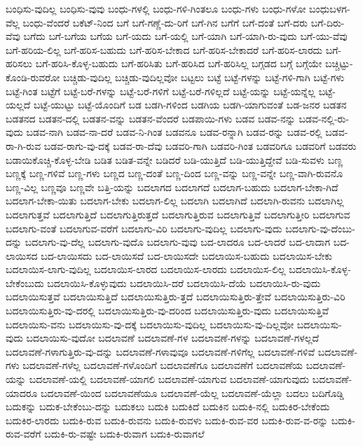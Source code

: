 {ಬಂಧಿಸು-ವುದಿಲ್ಲ
ಬಂಧಿಸು-ವುವು
ಬಂಧು-ಗಳಲ್ಲಿ
ಬಂಧು-ಗಳಿ-ಗಿಂತಲೂ
ಬಂಧು-ಗಳು
ಬಂಧು-ಗಳೋ
ಬಂಧುಬಳಗ-ವೆಲ್ಲ
ಬಂಧು-ವೆಂದರೆ
ಬಕೆಟ್-ನಿಂದ
ಬಗೆ
ಬಗೆ-ಗಣ್ಣೆ-ದು-ರಿಗೆ
ಬಗೆ-ಗಿನ
ಬಗೆಗೆ
ಬಗೆ-ದಂತೆ
ಬಗೆ-ದರು
ಬಗೆ-ದಿರು-ವೆವು
ಬಗೆದು
ಬಗೆ-ಬಗೆಯ
ಬಗೆಯ
ಬಗೆ-ಯದು
ಬಗೆ-ಯಲ್ಲಿ
ಬಗೆ-ಯಾಗಿ
ಬಗೆ-ಯಾಗಿ-ರು-ವುದು
ಬಗೆ-ಯು-ವೆವು
ಬಗೆ-ಹರಿಯ-ಲಿಲ್ಲ
ಬಗೆ-ಹರಿಸ-ಬಹುದು
ಬಗೆ-ಹರಿಸ-ಬೇಕಾದ
ಬಗೆ-ಹರಿಸ-ಬೇಕಾದರೆ
ಬಗೆ-ಹರಿಸ-ಲಾರದು
ಬಗೆ-ಹರಿಸಲು
ಬಗೆ-ಹರಿಸಿ-ಕೊಳ್ಳ-ಬಹುದು
ಬಗೆ-ಹರಿಸಿತು
ಬಗೆ-ಹರಿಸಿದ
ಬಗೆ-ಹರಿಸಿಲ್ಲ
ಬಗ್ಗಡದ
ಬಗ್ಗೆ
ಬಗ್ಗೆಯೇ
ಬಚ್ಚಿಟ್ಟು-ಕೊಂಡಿ-ರುವರೋ
ಬಚ್ಚಿಡು-ವುದಿಲ್ಲ
ಬಚ್ಚಿಡು-ವುದಿಲ್ಲವೋ
ಬಟ್ಟಲು
ಬಟ್ಟೆ
ಬಟ್ಟೆ-ಗಳನ್ನು
ಬಟ್ಟೆ-ಗಳಿ-ಗಾಗಿ
ಬಟ್ಟೆ-ಗಳು
ಬಟ್ಟೆ-ಗಿಂತ
ಬಟ್ಟೆಗೆ
ಬಟ್ಟೆ-ಬರೆ-ಗಳನ್ನು
ಬಟ್ಟೆ-ಬರೆ-ಗಳಿಗೆ
ಬಟ್ಟೆ-ಬರೆ-ಗಳಿಲ್ಲದೆ
ಬಟ್ಟೆ-ಯನ್ನು
ಬಟ್ಟೆ-ಯನ್ನೆಲ್ಲ
ಬಟ್ಟೆ-ಯಲ್ಲದೆ
ಬಟ್ಟೆ-ಯುಟ್ಟು
ಬಟ್ಟೆ-ಯೊಂದಿಗೆ
ಬಡ
ಬಡಗಿ-ಗಳಿಂದ
ಬಡಗಿಯ
ಬಡಗಿ-ಯಾಗುವಂತೆ
ಬಡ-ಜನರ
ಬಡತನ
ಬಡತನದ
ಬಡತನ-ದಲ್ಲಿ
ಬಡತನ-ವನ್ನು
ಬಡತನ-ವೆಂದರೆ
ಬಡಪಾಯಿ-ಗಳು
ಬಡವ
ಬಡವ-ನನ್ನು
ಬಡವ-ನಲ್ಲಿ-ರು-ವುದು
ಬಡವ-ನಾಗಿ
ಬಡವ-ನಾ-ದರೆ
ಬಡವ-ನಿ-ಗಿಂತ
ಬಡವನೂ
ಬಡವ-ರನ್ನಾಗಿ
ಬಡವ-ರನ್ನು
ಬಡವ-ರಲ್ಲಿ
ಬಡವ-ರಾ-ಗಿ-ರುವ
ಬಡವ-ರಾಗು-ವು-ದಕ್ಕೆ
ಬಡವ-ರಾ-ದೆವು
ಬಡವರಿ-ಗಾಗಿ
ಬಡವರಿ-ಗಿಂತ
ಬಡವರಿಗೂ
ಬಡವರಿಗೆ
ಬಡವರು
ಬಡಾಯಿಕೊಚ್ಚಿ-ಕೊಳ್ಳ-ಬೇಡಿ
ಬಡಿತ
ಬಡಿತ-ವನ್ನೇ
ಬಡಿದರೆ
ಬಡಿ-ಯುತ್ತಿದೆ
ಬಡಿ-ಯುತ್ತಿದ್ದೇವೆ
ಬಡಿ-ಸುವಳು
ಬಣ್ಣ
ಬಣ್ಣಕ್ಕೆ
ಬಣ್ಣ-ಗಳಿವೆ
ಬಣ್ಣ-ಗಳು
ಬಣ್ಣದ
ಬಣ್ಣ-ದಂತೆ
ಬಣ್ಣ-ದಿಂದ
ಬಣ್ಣ-ವನ್ನು
ಬಣ್ಣ-ವನ್ನೇ
ಬಣ್ಣ-ವಾಗಿ-ರುವನೊ
ಬಣ್ಣ-ವಿಲ್ಲ
ಬಣ್ಣವೂ
ಬಣ್ಣವೇ
ಬತ್ತಿ-ಯನ್ನು
ಬದಲಾಗದ
ಬದಲಾಗದೆ
ಬದಲಾಗ-ಬಹುದು
ಬದಲಾಗ-ಬೇಕಾ-ಗಿದೆ
ಬದಲಾಗ-ಬೇಕಾ-ಯಿತು
ಬದಲಾಗ-ಬೇಕು
ಬದಲಾಗ-ಲಿಲ್ಲ
ಬದಲಾಗಿ
ಬದಲಾಗಿದೆ
ಬದಲಾಗಿ-ರುವನು
ಬದಲಾಗಿಲ್ಲ
ಬದಲಾಗುತ್ತವೆ
ಬದಲಾಗುತ್ತಿದೆ
ಬದಲಾಗುತ್ತಿರುತ್ತದೆ
ಬದಲಾಗುತ್ತಿರುವ
ಬದಲಾಗುತ್ತಿವೆ
ಬದಲಾಗುತ್ತೀರಿ
ಬದಲಾಗುವ
ಬದಲಾಗು-ವಂತೆ
ಬದಲಾಗುವ-ವರೆಗೆ
ಬದಲಾಗು-ವಿರಿ
ಬದಲಾಗು-ವುದಿಲ್ಲ
ಬದಲಾಗು-ವುದು
ಬದಲಾಗು-ವು-ದೆಂಬು-ದನ್ನು
ಬದಲಾಗು-ವು-ದೆಲ್ಲ
ಬದಲಾಗು-ವುದೊ
ಬದಲಾಗು-ವುವು
ಬದ-ಲಾದರೂ
ಬದ-ಲಾದರೆ
ಬದ-ಲಾದಾಗ
ಬದ-ಲಾಯಿಸದ
ಬದ-ಲಾಯಿಸದು
ಬದ-ಲಾಯಿಸದೆ
ಬದ-ಲಾಯಿಸದೇ
ಬದಲಾಯಿಸ-ಬಹುದು
ಬದಲಾಯಿಸ-ಬೇಕು
ಬದಲಾಯಿಸ-ಲಾಗು-ವುದಿಲ್ಲ
ಬದಲಾಯಿಸ-ಲಾರದ
ಬದಲಾಯಿಸ-ಲಾರದು
ಬದಲಾಯಿಸ-ಲಿಲ್ಲ
ಬದಲಾಯಿಸಿ-ಕೊಳ್ಳ-ಬೇಕೆಂಬುದು
ಬದಲಾಯಿಸಿ-ಕೊಳ್ಳುವುದು
ಬದಲಾಯಿಸಿ-ದರೆ
ಬದಲಾಯಿಸಿ-ದೆಯೆ
ಬದಲಾಯಿಸಿ-ರು-ವುದು
ಬದಲಾಯಿಸುತ್ತವೆ
ಬದಲಾಯಿಸುತ್ತಿದೆ
ಬದಲಾಯಿಸುತ್ತಿರು-ತ್ತದೆ
ಬದಲಾಯಿಸುತ್ತಿರು-ತ್ತೇವೆ
ಬದಲಾಯಿಸುತ್ತಿರು-ವಿರಿ
ಬದಲಾಯಿಸುತ್ತಿರು-ವು-ದರಲ್ಲಿ
ಬದಲಾಯಿಸುತ್ತಿರು-ವು-ದರಿಂದ
ಬದಲಾಯಿಸುತ್ತಿರು-ವುದು
ಬದಲಾಯಿಸುತ್ತಿವೆ
ಬದಲಾಯಿಸು-ವನು
ಬದಲಾಯಿಸು-ವು-ದಕ್ಕೆ
ಬದಲಾಯಿಸು-ವುದಿಲ್ಲ
ಬದಲಾಯಿಸು-ವು-ದಿಲ್ಲವೋ
ಬದಲಾಯಿಸು-ವುದು
ಬದಲಾಯಿಸು-ವುದೋ
ಬದಲಾವಣೆ
ಬದಲಾವಣೆ-ಗಳ
ಬದಲಾವಣೆ-ಗಳನ್ನು
ಬದಲಾವಣೆ-ಗಳಲ್ಲದೆ
ಬದಲಾವಣೆ-ಗಳಾಗುತ್ತಿರು-ವು-ದನ್ನು
ಬದಲಾವಣೆ-ಗಳಾವುವೂ
ಬದಲಾವಣೆ-ಗಳಿಗೆಲ್ಲ
ಬದಲಾವಣೆ-ಗಳಿವೆ
ಬದಲಾವಣೆ-ಗಳು
ಬದಲಾವಣೆ-ಗಳೆಲ್ಲ
ಬದಲಾವಣೆ-ಗಳೊಂದಿಗೆ
ಬದಲಾವಣೆಗೂ
ಬದಲಾವಣೆಗೆ
ಬದಲಾವಣೆಯ
ಬದಲಾವಣೆ-ಯನ್ನು
ಬದಲಾವಣೆ-ಯಲ್ಲಿ
ಬದಲಾವಣೆ-ಯಾಗಲಿ
ಬದಲಾವಣೆ-ಯಾಗುವ
ಬದಲಾವಣೆ-ಯಾಗುವುದು
ಬದಲಾವಣೆ-ಯಾದರೂ
ಬದಲಾವಣೆ-ಯಿಂದ
ಬದಲಾವಣೆಯೂ
ಬದಲಾವಣೆ-ಯೆಲ್ಲ
ಬದಲಾವಣೆ-ಯೆಲ್ಲಾ
ಬದಲು
ಬದಿಗೊಡ್ಡಿ
ಬದುಕನ್ನು
ಬದುಕ-ಬೇಕೆಂಬು-ದನ್ನು
ಬದುಕಲು
ಬದುಕಿ
ಬದುಕಿದೆ
ಬದುಕಿನ
ಬದುಕಿ-ನಲ್ಲಿ
ಬದುಕಿರ-ಬೇಕೆಂದು
ಬದುಕಿರ-ಲಾರದು
ಬದುಕಿ-ರುವ
ಬದುಕಿ-ರುವನು
ಬದುಕಿ-ರುವಳು
ಬದುಕಿ-ರುವ-ವರ
ಬದುಕಿ-ರುವ-ವ-ರನ್ನು
ಬದುಕಿ-ರುವ-ವರೆಗೆ
ಬದುಕಿ-ರು-ವಷ್ಟೇ
ಬದುಕಿ-ರುವಾಗ
ಬದುಕಿ-ರುವಾಗಲೆ
}
